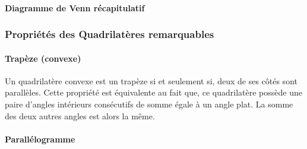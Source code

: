 \documentclass[a4paper, twoside]{article}
\begin{document}
\newpage
\paragraph*{Diagramme de Venn récapitulatif}

\begin{center}
\end{center}

\vspace*{-0.5cm}

\subsubsection{Propriétés des Quadrilatères remarquables}

\paragraph*{Trapèze (convexe)}

Un quadrilatère convexe est un trapèze si et seulement si,
deux de ses côtés sont parallèles.
Cette propriété est équivalente au fait que,
ce quadrilatère possède une paire d'angles intérieurs
consécutifs de somme égale à un angle plat.
La somme des deux autres angles est alors la même.

\vspace*{-0.25cm}

\paragraph*{Parallélogramme}
\end{document}
